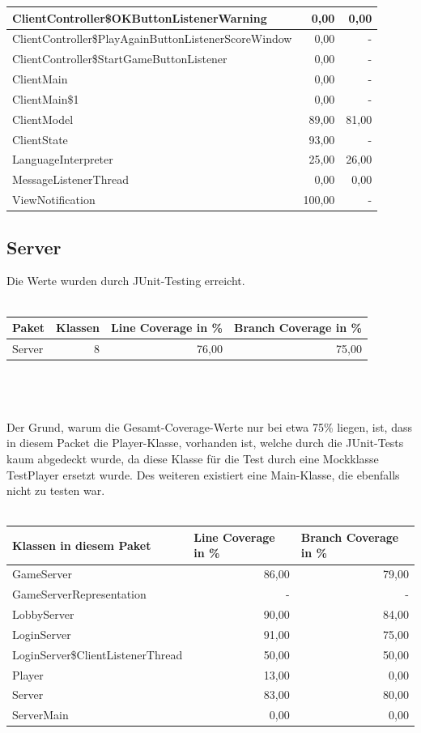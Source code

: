 \documentclass[a4paper]{article}
\begin{document}
\begin{tabular}{|l|r|r|}
ClientController\$OKButtonListenerWarning & 0,00 & \multicolumn{1}{r|}{0,00} \\ \hline
ClientController\$PlayAgainButtonListenerScoreWindow & 0,00 & - \\ \hline
ClientController\$StartGameButtonListener & 0,00 & - \\ \hline
ClientMain & 0,00 & - \\ \hline
ClientMain\$1 & 0,00 & - \\ \hline \hline
ClientModel & 89,00 & \multicolumn{1}{r|}{81,00} \\ \hline
ClientState & 93,00 & - \\ \hline
LanguageInterpreter & 25,00 & \multicolumn{1}{r|}{26,00} \\ \hline
MessageListenerThread & 0,00 & \multicolumn{1}{r|}{0,00} \\ \hline
ViewNotification & 100,00 & - \\ \hline
\end{tabular}


	\subsection{Server}
Die Werte wurden durch JUnit-Testing erreicht.
 \ \\ \ \\ 	
	\noindent	
\begin{tabular}{|l|r|r|r|}
\hline
Paket & Klassen & Line Coverage in \% & Branch Coverage in \% \\ \hline \hline
Server & \multicolumn{1}{r|}{8} & \multicolumn{1}{r|}{76,00} & \multicolumn{1}{r|}{75,00} \\ \hline
\end{tabular}
 \ \\ \ \\ \ \\
Der Grund, warum die Gesamt-Coverage-Werte nur bei etwa 75\% liegen, ist, dass in diesem Packet die Player-Klasse, vorhanden ist, welche durch die JUnit-Tests kaum abgedeckt wurde, da diese Klasse für die Test durch eine Mockklasse TestPlayer ersetzt wurde. Des weiteren existiert eine Main-Klasse, die ebenfalls nicht zu testen war.\\
\ \\
\noindent
\begin{tabular}{|l|r|r|}
\hline
Klassen in diesem Paket & \multicolumn{1}{l|}{Line Coverage in \%} & \multicolumn{1}{l|}{Branch Coverage in \%} \\ \hline \hline
GameServer & 86,00 & 79,00 \\ \hline
GameServerRepresentation & - & - \\ \hline
LobbyServer & 90,00 & 84,00 \\ \hline
LoginServer & 91,00 & 75,00 \\ \hline
LoginServer\$ClientListenerThread & 50,00 & 50,00 \\ \hline
Player & 13,00 & 0,00 \\ \hline
Server & 83,00 & 80,00 \\ \hline
ServerMain & 0,00 & 0,00 \\ \hline
\end{tabular}
\end{document}
